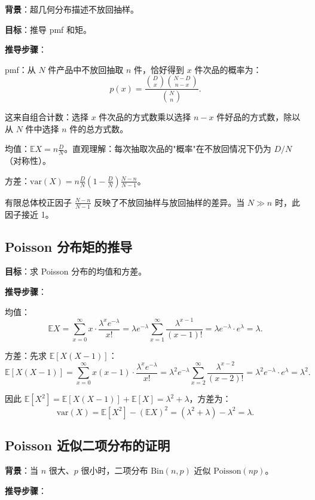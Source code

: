 \textbf{背景}：超几何分布描述不放回抽样。

\textbf{目标}：推导 pmf 和矩。

\textbf{推导步骤}：

pmf：从 $N$ 件产品中不放回抽取 $n$ 件，恰好得到 $x$ 件次品的概率为：
\[
p(x) = \frac{\binom{D}{x} \binom{N-D}{n-x}}{\binom{N}{n}}.
\]

这来自组合计数：选择 $x$ 件次品的方式数乘以选择 $n-x$ 件好品的方式数，除以从 $N$ 件中选择 $n$ 件的总方式数。

均值：$\mathbb{E}X = n\frac{D}{N}$。直观理解：每次抽取次品的"概率"在不放回情况下仍为 $D/N$（对称性）。

方差：$\text{var}(X) = n\frac{D}{N}\left(1-\frac{D}{N}\right)\frac{N-n}{N-1}$。

有限总体校正因子 $\frac{N-n}{N-1}$ 反映了不放回抽样与放回抽样的差异。当 $N \gg n$ 时，此因子接近 1。

\subsection{Poisson 分布矩的推导}\label{sec:derivation-poisson-moments}

\textbf{目标}：求 Poisson 分布的均值和方差。

\textbf{推导步骤}：

均值：
\[
\mathbb{E}X = \sum_{x=0}^{\infty} x \cdot \frac{\lambda^{x} e^{-\lambda}}{x!} = \lambda e^{-\lambda} \sum_{x=1}^{\infty} \frac{\lambda^{x-1}}{(x-1)!} = \lambda e^{-\lambda} \cdot e^{\lambda} = \lambda.
\]

方差：先求 $\mathbb{E}[X(X-1)]$：
\[
\mathbb{E}[X(X-1)] = \sum_{x=0}^{\infty} x(x-1) \cdot \frac{\lambda^{x} e^{-\lambda}}{x!} = \lambda^{2} e^{-\lambda} \sum_{x=2}^{\infty} \frac{\lambda^{x-2}}{(x-2)!} = \lambda^{2} e^{-\lambda} \cdot e^{\lambda} = \lambda^{2}.
\]

因此 $\mathbb{E}[X^{2}] = \mathbb{E}[X(X-1)] + \mathbb{E}[X] = \lambda^{2} + \lambda$，方差为：
\[
\text{var}(X) = \mathbb{E}[X^{2}] - (\mathbb{E}X)^{2} = (\lambda^{2} + \lambda) - \lambda^{2} = \lambda.
\]

\subsection{Poisson 近似二项分布的证明}\label{sec:derivation-poisson-limit}

\textbf{背景}：当 $n$ 很大、$p$ 很小时，二项分布 $\text{Bin}(n, p)$ 近似 $\text{Poisson}(np)$。

\textbf{推导步骤}：

